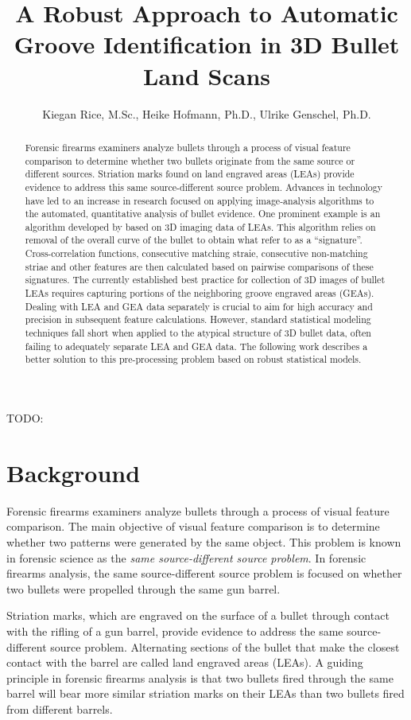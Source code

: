 \documentclass[]{article}
\title{A Robust Approach to Automatic Groove Identification in 3D Bullet Land
Scans}
\author{Kiegan Rice, M.Sc., Heike Hofmann, Ph.D., Ulrike Genschel, Ph.D.}
\date{}
\begin{document}
\maketitle
\begin{abstract}
Forensic firearms examiners analyze bullets through a process of visual
feature comparison to determine whether two bullets originate from the
same source or different sources. Striation marks found on land engraved
areas (LEAs) provide evidence to address this same source-different
source problem. Advances in technology have led to an increase in
research focused on applying image-analysis algorithms to the automated,
quantitative analysis of bullet evidence. One prominent example is an
algorithm developed by \citep{Hare1} based on 3D imaging data of LEAs.
This algorithm relies on removal of the overall curve of the bullet to
obtain what \citep{Hare1} refer to as a ``signature''. Cross-correlation
functions, consecutive matching straie, consecutive non-matching striae
and other features are then calculated based on pairwise comparisons of
these signatures. The currently established best practice for collection
of 3D images of bullet LEAs requires capturing portions of the
neighboring groove engraved areas (GEAs). Dealing with LEA and GEA data
separately is crucial to aim for high accuracy and precision in
subsequent feature calculations. However, standard statistical modeling
techniques fall short when applied to the atypical structure of 3D
bullet data, often failing to adequately separate LEA and GEA data. The
following work describes a better solution to this pre-processing
problem based on robust statistical models.
\end{abstract}

TODO:

\section{Background}

Forensic firearms examiners analyze bullets through a process of visual
feature comparison. The main objective of visual feature comparison is
to determine whether two patterns were generated by the same object.
This problem is known in forensic science as the \emph{same
source-different source problem}. In forensic firearms analysis, the
same source-different source problem is focused on whether two bullets
were propelled through the same gun barrel.

Striation marks, which are engraved on the surface of a bullet through
contact with the rifling of a gun barrel, provide evidence to address
the same source-different source problem. Alternating sections of the
bullet that make the closest contact with the barrel are called land
engraved areas (LEAs). A guiding principle in forensic firearms analysis
is that two bullets fired through the same barrel will bear more similar
striation marks on their LEAs than two bullets fired from different
barrels.
\end{document}
